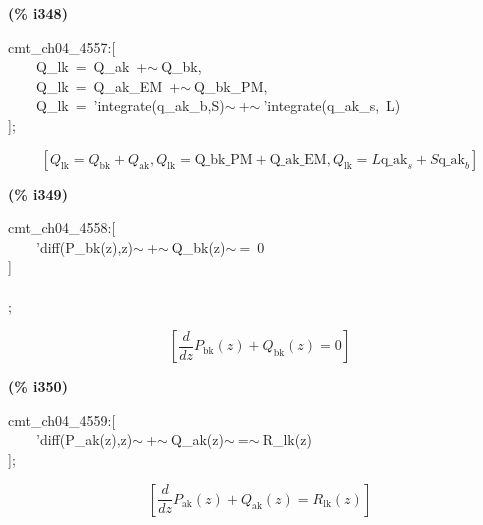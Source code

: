 \documentclass[fleqn]{article}
\begin{document}
\noindent
\begin{minipage}[t]{4.000000em}\color{red}\bfseries
(\% i348)	
\end{minipage}
\begin{minipage}[t]{\textwidth}\color{blue}
cmt\_ch04\_4557:[\\
\ \ \ \ Q\_lk\ =\ Q\_ak\ +\ensuremath{\sim\ }Q\_bk,\\
\ \ \ \ Q\_lk\ =\ Q\_ak\_EM\ +\ensuremath{\sim\ }Q\_bk\_PM,\\
\ \ \ \ Q\_lk\ =\ 'integrate(q\_ak\_b,S)\ensuremath{\sim\ }+\ensuremath{\sim\ }'integrate(q\_ak\_s,\ L)\\
];
\end{minipage}
\[\displaystyle \tag{\% o348} 
\left[ {Q_{\ensuremath{\mathrm{lk}}}}={Q_{\ensuremath{\mathrm{bk}}}}+{Q_{\ensuremath{\mathrm{ak}}}}\operatorname{,}{Q_{\ensuremath{\mathrm{lk}}}}=\ensuremath{\mathrm{Q\_ bk\_ PM}}+\ensuremath{\mathrm{Q\_ ak\_ EM}}\operatorname{,}{Q_{\ensuremath{\mathrm{lk}}}}=L {{\ensuremath{\mathrm{q\_ ak}}}_s}+S {{\ensuremath{\mathrm{q\_ ak}}}_b}\right] \mbox{}
\]


\noindent
\begin{minipage}[t]{4.000000em}\color{red}\bfseries
(\% i349)	
\end{minipage}
\begin{minipage}[t]{\textwidth}\color{blue}
cmt\_ch04\_4558:[\\
\ \ \ \ 'diff(P\_bk(z),z)\ensuremath{\sim\ }+\ensuremath{\sim\ }Q\_bk(z)\ensuremath{\sim\ }=\ 0\\
]\\
\\
;
\end{minipage}
\[\displaystyle \tag{\% o349} 
\left[ \frac{d}{d z} {P_{\ensuremath{\mathrm{bk}}}}(z)+{Q_{\ensuremath{\mathrm{bk}}}}(z)=0\right] \mbox{}
\]


\noindent
\begin{minipage}[t]{4.000000em}\color{red}\bfseries
(\% i350)	
\end{minipage}
\begin{minipage}[t]{\textwidth}\color{blue}
cmt\_ch04\_4559:[\\
\ \ \ \ 'diff(P\_ak(z),z)\ensuremath{\sim\ }+\ensuremath{\sim\ }Q\_ak(z)\ensuremath{\sim\ }=\ensuremath{\sim\ }R\_lk(z)\\
];
\end{minipage}
\[\displaystyle \tag{\% o350} 
\left[ \frac{d}{d z} {P_{\ensuremath{\mathrm{ak}}}}(z)+{Q_{\ensuremath{\mathrm{ak}}}}(z)={R_{\ensuremath{\mathrm{lk}}}}(z)\right] \mbox{}
\]
\end{document}
